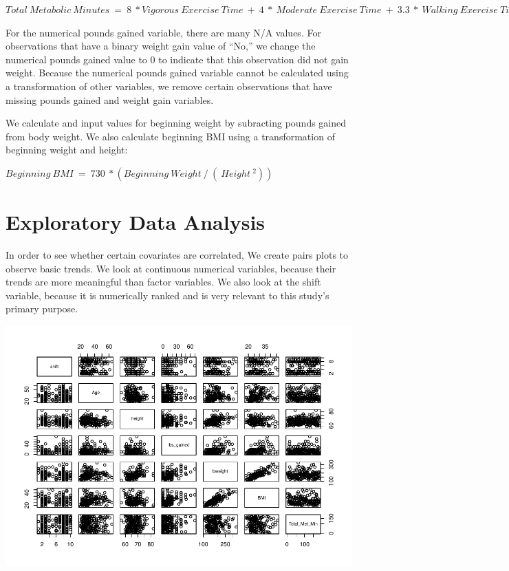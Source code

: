 \documentclass[]{article}
\begin{document}
\(Total\:Metabolic\:Minutes\:=\:8\:*Vigorous\:Exercise\:Time\:+\:4\:*\:Moderate\:Exercise\:Time\:+\:3.3\:*\:Walking\:Exercise\:Time\)

For the numerical pounds gained variable, there are many N/A values. For
observations that have a binary weight gain value of ``No,'' we change
the numerical pounds gained value to 0 to indicate that this observation
did not gain weight. Because the numerical pounds gained variable cannot
be calculated using a transformation of other variables, we remove
certain observations that have missing pounds gained and weight gain
variables.

We calculate and input values for beginning weight by subracting pounds
gained from body weight. We also calculate beginning BMI using a
transformation of beginning weight and height:

\(Beginning\:BMI\:=\:730\:*(Beginning\:Weight\:/\:(\:Height\:^2))\)

\hypertarget{exploratory-data-analysis}{%
\section{Exploratory Data Analysis}\label{exploratory-data-analysis}}

In order to see whether certain covariates are correlated, We create
pairs plots to observe basic trends. We look at continuous numerical
variables, because their trends are more meaningful than factor
variables. We also look at the shift variable, because it is numerically
ranked and is very relevant to this study's primary purpose.

\includegraphics{Practicum-1-Technical-Report_v2_files/figure-latex/Pairs Plots-1.pdf}
\end{document}
